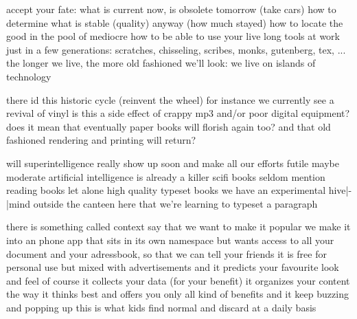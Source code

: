 
\startsection[title={future}]
    \startitemize
    \startitem accept your fate: what is current now, is obsolete tomorrow (take cars) \stopitem
    \startitem how to determine what is stable (quality) anyway (how much stayed) \stopitem
    \startitem how to locate the good in the pool of mediocre \stopitem
    \startitem how to be able to use your live long tools at work \stopitem
    \startitem just in a few generations: scratches, chisseling, scribes, monks, gutenberg, tex, ...  \stopitem
    \startitem the longer we live, the more old fashioned we'll look: we live on islands of technology \stopitem
    \stopitemize
\stopsection

\startsection[title={history cycles}]
    \startitemize
    \startitem there id this historic cycle (reinvent the wheel) \stopitem
    \startitem for instance we currently see a revival of vinyl \stopitem
    \startitem is this a side effect of crappy mp3 and/or poor digital equipment? \stopitem
    \startitem does it mean that eventually paper books will florish again too? \stopitem
    \startitem and that old fashioned rendering and printing will return? \stopitem
    \stopitemize
\stopsection

\startsection[title={consider the following}]
    \startitemize
    \startitem will superintelligence really show up soon and make all our efforts futile \stopitem
    \startitem maybe moderate artificial intelligence is already a killer \stopitem
    \startitem scifi books seldom mention reading books \stopitem
    \startitem let alone high quality typeset books \stopitem
    \startitem we have an experimental hive|-|mind outside the canteen here that we're learning to typeset a paragraph\stopitem
    \stopitemize
\stopsection

\startsection[title={think of this 1}]
    \startitemize
    \startitem there is something called context \stopitem
    \startitem say that we want to make it popular \stopitem
    \startitem we make it into an phone app \stopitem
    \startitem that sits in its own namespace \stopitem
    \startitem but wants access to all your document \stopitem
    \startitem and your adressbook, so that we can tell your friends \stopitem
    \startitem it is free for personal use \stopitem
    \startitem but mixed with advertisements \stopitem
    \startitem and it predicts your favourite look and feel \stopitem
    \startitem of course it collects your data (for your benefit) \stopitem
    \startitem it organizes your content the way it thinks best \stopitem
    \startitem and offers you only all kind of benefits \stopitem
    \startitem and it keep buzzing and popping up \stopitem
    \startitem this is what kids find normal \stopitem
    \startitem and discard at a daily basis \stopitem
    \stopitemize
\stopsection

